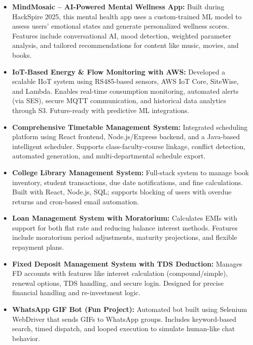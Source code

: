 \documentclass[10pt,a4paper]{article}
\begin{document}
\begin{itemize}[leftmargin=*]
    \item \textbf{MindMosaic – AI-Powered Mental Wellness App:} Built during HackSpire 2025, this mental health app uses a custom-trained ML model to assess users' emotional states and generate personalized wellness scores. Features include conversational AI, mood detection, weighted parameter analysis, and tailored recommendations for content like music, movies, and books.

    \item \textbf{IoT-Based Energy \& Flow Monitoring with AWS:} Developed a scalable IIoT system using RS485-based sensors, AWS IoT Core, SiteWise, and Lambda. Enables real-time consumption monitoring, automated alerts (via SES), secure MQTT communication, and historical data analytics through S3. Future-ready with predictive ML integrations.

    \item \textbf{Comprehensive Timetable Management System:} Integrated scheduling platform using React frontend, Node.js/Express backend, and a Java-based intelligent scheduler. Supports class-faculty-course linkage, conflict detection, automated generation, and multi-departmental schedule export.

    \item \textbf{College Library Management System:} Full-stack system to manage book inventory, student transactions, due date notifications, and fine calculations. Built with React, Node.js, SQL; supports blocking of users with overdue returns and cron-based email automation.

    \item \textbf{Loan Management System with Moratorium:} Calculates EMIs with support for both flat rate and reducing balance interest methods. Features include moratorium period adjustments, maturity projections, and flexible repayment plans.

    \item \textbf{Fixed Deposit Management System with TDS Deduction:} Manages FD accounts with features like interest calculation (compound/simple), renewal options, TDS handling, and secure login. Designed for precise financial handling and re-investment logic.

    \item \textbf{WhatsApp GIF Bot (Fun Project):} Automated bot built using Selenium WebDriver that sends GIFs to WhatsApp groups. Includes keyword-based search, timed dispatch, and looped execution to simulate human-like chat behavior.
\end{itemize}
\end{document}
